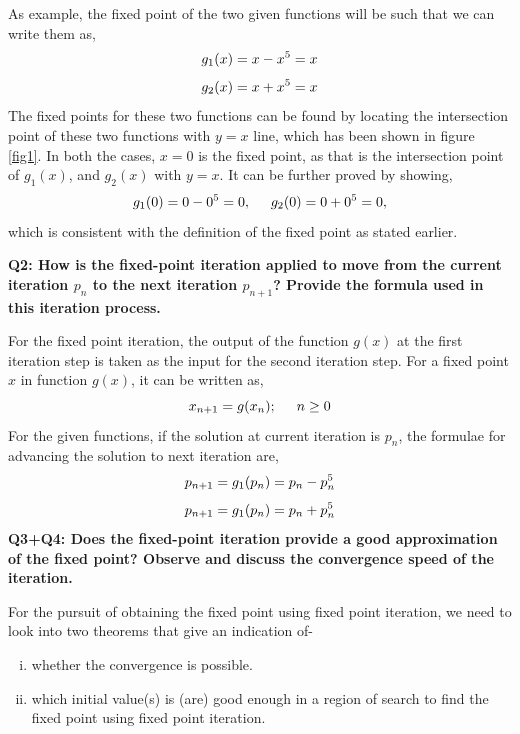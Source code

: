 \documentclass[11pt]{article} %
\begin{document}
As example, the fixed point of the two given functions will be such that we can write them as,
\begin{equation}
\centering
g_1(x) = x - x^5 = x
\label{eq1}
\end{equation}
\begin{equation}
\centering
g_2(x) = x + x^5 = x
\label{eq2}
\end{equation}
The fixed points for these two functions can be found by locating the intersection point of these two functions with $y = x$ line, which has been shown in figure \ref{fig1}. In both the cases, $x = 0$ is the fixed point, as that is the intersection point of $g_1(x)$, and $g_2(x)$ with $y = x$. It can be further proved by showing,
\begin{equation}
\centering
g_1(0) = 0 - 0^5 = 0,  \hspace{0.5cm} g_2(0) = 0 + 0^5 = 0,
\label{eq3}
\end{equation}
which is consistent with the definition of the fixed point as stated earlier.

\textbf{Q2: How is the fixed-point iteration applied to move from the current iteration \textbf{$p_n$} to the
next iteration \textbf{$p_{n+1}$}? Provide the formula used in this iteration process.}

For the fixed point iteration, the output of the function $g(x)$ at the first iteration step is taken as the input for the second iteration step. For a fixed point $x$ in function $g(x)$, it can be written as,
\begin{equation}
\centering
x_{n+1} = g(x_n); \hspace{0.5cm} n\geq0
\label{eq4}
\end{equation}
For the given functions, if the solution at current iteration is $p_n$, the formulae for advancing the solution to next iteration are,
\begin{equation}
\centering
p_{n+1} = g_1(p_n) = p_n - p_n^5
\label{eq5}
\end{equation}
\begin{equation}
\centering
p_{n+1} = g_1(p_n) = p_n + p_n^5
\label{eq6}
\end{equation}
\textbf{Q3+Q4: Does the fixed-point iteration provide a good approximation of the fixed point? Observe and discuss the convergence speed of the iteration.}

For the pursuit of obtaining the fixed point using fixed point iteration, we need to look into two theorems that give an indication of-
\begin{enumerate}[i.]
\item whether the convergence is possible.
\item which initial value(s) is (are) good enough in a region of search to find the fixed point using fixed point iteration.
\end{enumerate}
\end{document}
